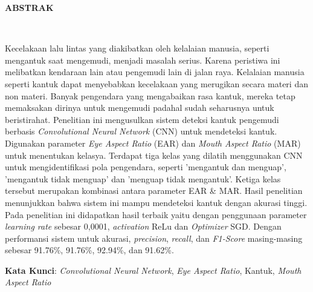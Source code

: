 \clearpage
\centering
{}
 \vspace{1em}
\normalsize \bfseries \centering \MakeUppercase{Abstrak}
% 
\\[2\baselineskip]

\justifying \normalfont \normalsize
{

Kecelakaan lalu lintas yang diakibatkan oleh kelalaian manusia, seperti mengantuk saat mengemudi, menjadi masalah serius. Karena peristiwa ini  melibatkan kendaraan lain atau pengemudi lain di jalan raya. Kelalaian manusia seperti kantuk dapat menyebabkan kecelakaan yang merugikan secara materi dan non materi. Banyak pengendara yang mengabaikan rasa kantuk, mereka tetap memaksakan dirinya untuk mengemudi padahal sudah seharusnya untuk beristirahat. Penelitian ini mengusulkan sistem deteksi kantuk pengemudi berbasis \textit{Convolutional Neural Network} (CNN) untuk mendeteksi kantuk. Digunakan parameter \textit{Eye Aspect Ratio} (EAR) dan \textit{Mouth Aspect Ratio} (MAR) untuk menentukan kelasya. Terdapat tiga kelas yang dilatih menggunakan CNN untuk mengidentifikasi pola pengendara, seperti 'mengantuk dan menguap', 'mengantuk tidak menguap' dan 'menguap tidak mengantuk'. Ketiga kelas tersebut 
merupakan kombinasi antara parameter EAR \& MAR. Hasil penelitian menunjukkan bahwa sistem ini mampu mendeteksi kantuk dengan akurasi tinggi. Pada penelitian ini didapatkan hasil terbaik yaitu dengan penggunaan parameter \textit{learning rate} sebesar 0,0001, \textit{activation} ReLu dan \textit{Optimizer} SGD. Dengan performansi sistem untuk akurasi, \textit{precision}, \textit{recall}, dan \textit{F1-Score} masing-masing sebesar 91.76\%, 91.76\%, 92.94\%, dan 91.62\%.

}

\textbf{Kata Kunci}: \textit{Convolutional Neural Network}, \textit{Eye Aspect Ratio}, Kantuk, \textit{Mouth Aspect Ratio}
\clearpage